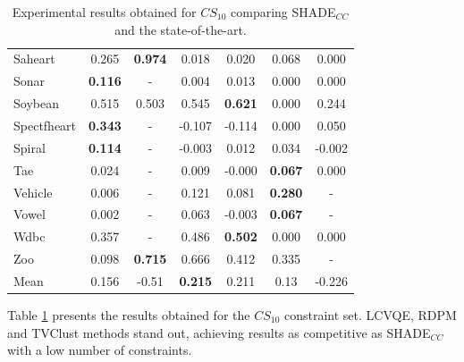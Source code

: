 \documentclass[review]{elsarticle}
\begin{document}
\begin{table}[!h]
{\begin{tabular}{lcccccc}
			Saheart & 0.265 & \textbf{0.974} & 0.018 & 0.020 & 0.068 & 0.000 \\
			Sonar & \textbf{0.116} & - & 0.004 & 0.013 & 0.000 & 0.000 \\
			Soybean & 0.515 & 0.503 & 0.545 & \textbf{0.621} & 0.000 & 0.244 \\
			Spectfheart & \textbf{0.343} & - & -0.107 & -0.114 & 0.000 & 0.050 \\
			Spiral & \textbf{0.114} & - & -0.003 & 0.012 & 0.034 & -0.002 \\
			Tae & 0.024 & - & 0.009 & -0.000 & \textbf{0.067} & 0.000 \\
			Vehicle & 0.006 & - & 0.121 & 0.081 & \textbf{0.280} & - \\
			Vowel & 0.002 & - & 0.063 & -0.003 & \textbf{0.067} & - \\
			Wdbc & 0.357 & - & 0.486 & \textbf{0.502} & 0.000 & 0.000 \\
			Zoo & 0.098 & \textbf{0.715} & 0.666 & 0.412 & 0.335 & - \\
			\hline
			Mean  & 0.156 & -0.51 & \textbf{0.215} & 0.211 & 0.13 & -0.226 \\
			\hline
		\end{tabular}}
		
	\caption{Experimental results obtained for $CS_{10}$ comparing SHADE$_{CC}$ and the state-of-the-art.}
	\label{tab:results10SOTA}
\end{table}

Table \ref{tab:results10SOTA} presents the results obtained for the $CS_{10}$ constraint set. LCVQE, RDPM and TVClust methods stand out, achieving results as competitive as SHADE$_{CC}$ with a low number of constraints.
\end{document}
